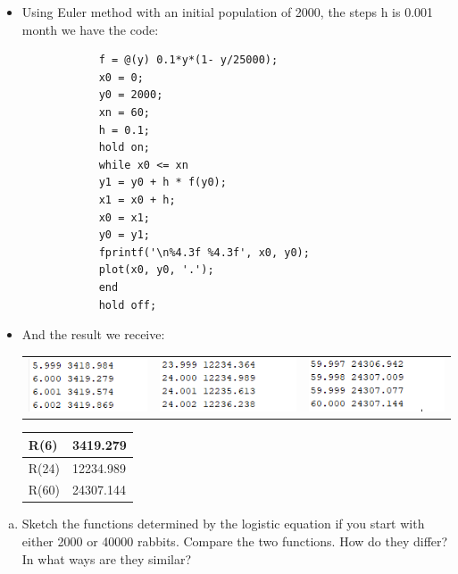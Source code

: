 \documentclass[12pt,en,a4paper]{article}
\begin{document}
	\begin{itemize}
		\item Using Euler method with an initial population of 2000, the steps h is 0.001 month we have the code:\\
		\begin{mdframed}[hidealllines=true,backgroundcolor=magenta!10]
			\begin{lstlisting}
			f = @(y) 0.1*y*(1- y/25000);
			x0 = 0;
			y0 = 2000;
			xn = 60;
			h = 0.1;
			hold on;
			while x0 <= xn
			y1 = y0 + h * f(y0);
			x1 = x0 + h;
			x0 = x1;
			y0 = y1;
			fprintf('\n%4.3f %4.3f', x0, y0);
			plot(x0, y0, '.');
			end
			hold off;
			\end{lstlisting}
		\end{mdframed}
		\item And the result we receive:
		\begin{table}[h]
			\centering
			\begin{tabular}{lll}
				\includegraphics{table1.png}&\includegraphics{table2.png}  & \includegraphics{table3.png}
			\end{tabular}
		\end{table}
		\begin{table}[h]
			\centering
			\begin{tabular}{|l|l|}
				\hline
				R(6)  & 3419.279  \\ \hline
				R(24) & 12234.989 \\ \hline
				R(60) & 24307.144 \\ \hline
			\end{tabular}
		\end{table}
	\end{itemize}
	\begin{enumerate}[b)]
		\item Sketch the functions determined by the logistic equation if you start with either 2000 or 40000 rabbits. Compare the two functions. How do they differ? In what ways are they similar?
	\end{enumerate}
\end{document}
